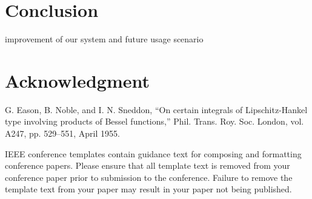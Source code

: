 \documentclass[conference]{IEEEtran}
\begin{document}
\section{Conclusion}
    improvement of our system and future usage scenario

\section*{Acknowledgment}




\begin{thebibliography}{00}
     G. Eason, B. Noble, and I. N. Sneddon, ``On certain integrals of Lipschitz-Hankel type involving products of Bessel functions,'' Phil. Trans. Roy. Soc. London, vol. A247, pp. 529--551, April 1955.
\end{thebibliography}
\vspace{12pt}
\color{red}
IEEE conference templates contain guidance text for composing and formatting conference papers. Please ensure that all template text is removed from your conference paper prior to submission to the conference. Failure to remove the template text from your paper may result in your paper not being published.
\end{document}
